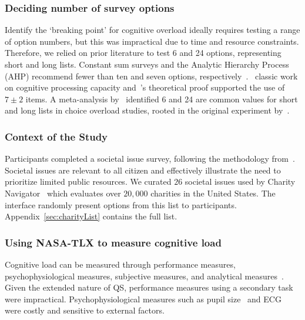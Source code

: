 \subsubsection{Deciding number of survey options}
Identify the `breaking point' for cognitive overload ideally requires testing a range of option numbers, but this was impractical due to time and resource constraints. Therefore, we relied on prior literature to test 6 and 24 options, representing short and long lists. Constant sum surveys and the Analytic Hierarchy Process (AHP) recommend fewer than ten and seven options, respectively~\cite{moroneyQuestionnaireDesignHow2019, saatyGroupDecisionMaking2013, saatyPrinciplesAnalyticHierarchy1987}.~\textcite{millerMagicalNumberSeven1956} classic work on cognitive processing capacity and~\textcite{saaty2003magic}'s theoretical proof supported the use of $7\pm2$ items. A meta-analysis by~\textcite{chernevChoiceOverloadConceptual2015}  identified 6 and 24 are common values for short and long lists in choice overload studies, rooted in the original experiment by~\textcite{iyengarWhenChoiceDemotivating2000}.%

\subsubsection{Context of the Study}
Participants completed a societal issue survey, following the methodology from~\textcite{chengCanShowWhat2021}. Societal issues are relevant to all citizen and effectively illustrate the need to prioritize limited public resources. We curated $26$ societal issues used by Charity Navigator~\cite{CharityNavigator2023} which evaluates over $20,000$ charities in the United States. The interface randomly present options from this list to participants. Appendix~\ref{sec:charityList} contains the full list.

\subsubsection{Using NASA-TLX to measure cognitive load}
Cognitive load can be measured through performance measures, psychophysiological measures, subjective measures, and analytical measures~\cite{gaoMentalWorkloadMeasurement2013}. Given the extended nature of QS, performance measures using a secondary task were impractical. Psychophysiological measures such as pupil size~\cite{palinkoEstimatingCognitiveLoad2010} and ECG~\cite{haapalainenPsychophysiologicalMeasuresAssessing2010} were costly and sensitive to external factors. 


